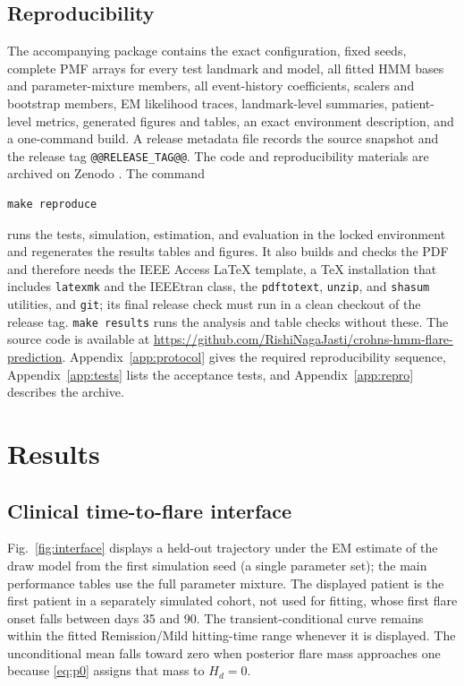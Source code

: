 \documentclass{ieeeaccess}
\begin{document}
\subsection{Reproducibility}
The accompanying package contains the exact configuration, fixed seeds, complete PMF arrays for every test landmark and model, all fitted HMM bases and parameter-mixture members, all event-history coefficients, scalers and bootstrap members, EM likelihood traces, landmark-level summaries, patient-level metrics, generated figures and tables, an exact environment description, and a one-command build. A release metadata file records the source snapshot and the release tag \texttt{@@RELEASE_TAG@@}. The code and reproducibility materials are archived on Zenodo \cite{jasti2026code}. The command
\begin{verbatim}
make reproduce
\end{verbatim}
runs the tests, simulation, estimation, and evaluation in the locked environment and regenerates the results tables and figures. It also builds and checks the PDF and therefore needs the IEEE Access \LaTeX{} template, a \TeX{} installation that includes \texttt{latexmk} and the IEEEtran class, the \texttt{pdftotext}, \texttt{unzip}, and \texttt{shasum} utilities, and \texttt{git}; its final release check must run in a clean checkout of the release tag. \texttt{make results} runs the analysis and table checks without these. The source code is available at \url{https://github.com/RishiNagaJasti/crohns-hmm-flare-prediction}. Appendix~\ref{app:protocol} gives the required reproducibility sequence, Appendix~\ref{app:tests} lists the acceptance tests, and Appendix~\ref{app:repro} describes the archive.




\section{Results}\label{sec:results}
\subsection{Clinical time-to-flare interface}
Fig.~\ref{fig:interface} displays a held-out trajectory under the EM estimate of the draw model from the first simulation seed (a single parameter set); the main performance tables use the full parameter mixture. The displayed patient is the first patient in a separately simulated cohort, not used for fitting, whose first flare onset falls between days 35 and 90. The transient-conditional curve remains within the fitted Remission/Mild hitting-time range whenever it is displayed. The unconditional mean falls toward zero when posterior flare mass approaches one because \eqref{eq:p0} assigns that mass to $H_d=0$.
\end{document}
